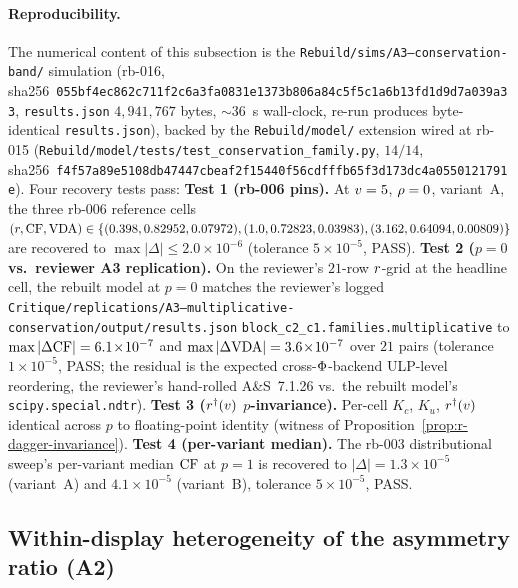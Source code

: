\paragraph{Reproducibility.}
The numerical content of this subsection is the \texttt{Rebuild/sims/A3--conservation-band/}
simulation (rb-016, sha256~\texttt{055bf4ec862c711f2c6a3fa0831e1373b806a84c5f5c1a6b13fd1d9d7a039a33},
\texttt{results.json} $4{,}941{,}767$ bytes, $\sim$$36$~s wall-clock,
re-run produces byte-identical \texttt{results.json}), backed by the
\texttt{Rebuild/model/} extension wired at rb-015
(\texttt{Rebuild/model/tests/}\allowbreak\texttt{test\_conservation\_family.py},
$14/14$, sha256~\texttt{f4f57a89e5108db47447cbeaf2f15440f56cdfffb65f3d173dc4a0550121791e}).
Four recovery tests pass:
\textbf{Test 1 (rb-006 pins).}
At $v = 5$, $\rho = 0$, variant~A, the three rb-006 reference
cells $(r, \mathrm{CF}, \mathrm{VDA}) \in \{(0.398, 0.82952, 0.07972),\allowbreak
(1.0, 0.72823, 0.03983),\allowbreak (3.162, 0.64094, 0.00809)\}$ are
recovered to $\max|\Delta| \le 2.0\!\times\!10^{-6}$ (tolerance
$5\!\times\!10^{-5}$, PASS).
\textbf{Test 2 ($p = 0$ vs.\ reviewer A3 replication).}
On the reviewer's $21$-row $r$-grid at the headline cell, the
rebuilt model at $p = 0$ matches the reviewer's logged
\texttt{Critique/replications/A3--multiplicative-conservation/}\allowbreak\texttt{output/results.json}
\texttt{block\_c2\_c1.families.multiplicative} to
$\max|\Delta\mathrm{CF}| = 6.1\!\times\!10^{-7}$ and
$\max|\Delta\mathrm{VDA}| = 3.6\!\times\!10^{-7}$ over $21$ pairs (tolerance
$1\!\times\!10^{-5}$, PASS; the residual is the expected cross-$\Phi$-backend
ULP-level reordering, the reviewer's hand-rolled A\&S~7.1.26 vs.\ the
rebuilt model's \texttt{scipy.special.ndtr}).
\textbf{Test 3 ($r^{\dagger}(v)$ $p$-invariance).}
Per-cell $K_c$, $K_u$, $r^{\dagger}(v)$ identical across $p$ to
floating-point identity (witness of
Proposition~\ref{prop:r-dagger-invariance}).
\textbf{Test 4 (per-variant median).}
The rb-003 distributional sweep's per-variant median $\mathrm{CF}$ at $p = 1$
is recovered to $|\Delta| = 1.3\!\times\!10^{-5}$ (variant~A) and
$4.1\!\times\!10^{-5}$ (variant~B), tolerance $5\!\times\!10^{-5}$,
PASS.

\subsection{Within-display heterogeneity of the asymmetry ratio (A2)}
\label{sec:extensions-a2}

